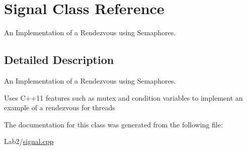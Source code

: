 \hypertarget{class_signal}{}\section{Signal Class Reference}
\label{class_signal}


An Implementation of a Rendezvous using Semaphores.  




\subsection{Detailed Description}
An Implementation of a Rendezvous using Semaphores. 

Uses C++11 features such as mutex and condition variables to implement an example of a rendezvous for threads 

The documentation for this class was generated from the following file\+:\begin{DoxyCompactItemize}
\item 
Lab2/\hyperlink{signal_8cpp}{signal.\+cpp}\end{DoxyCompactItemize}
